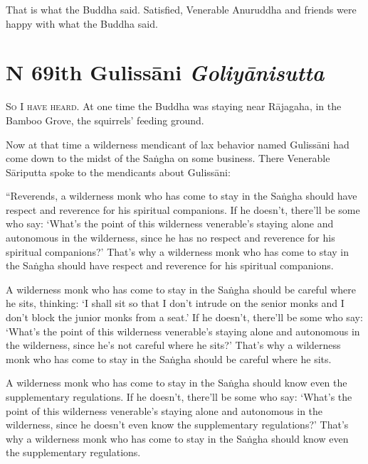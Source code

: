 \documentclass[12pt,openany]{book}%
\newcommand*{\suttatitleacronym}[1]{\smaller[2]{#1}\vspace*{.3em}}
\newcommand*{\suttatitletranslation}[1]{\linebreak{#1}}
\newcommand*{\suttatitleroot}[1]{\linebreak\smaller[2]\itshape{#1}}
\newcommand*{\tocacronym}[1]{\hspace*{-3.3em}{#1}\quad}
\newcommand*{\toctranslation}[1]{#1}
\newcommand*{\tocroot}[1]{(\textit{#1})}
\newcommand*{\scevam}[1]{\textsc{#1}}
\begin{document}
That is what the Buddha said. Satisfied, Venerable Anuruddha and friends were happy with what the Buddha said. 

%
\section*{{\suttatitleacronym MN 69}{\suttatitletranslation With Gulissāni }{\suttatitleroot Goliyānisutta}}
\addcontentsline{toc}{section}{\tocacronym{MN 69} \toctranslation{With Gulissāni } \tocroot{Goliyānisutta}}

\scevam{So I have heard. }At one time the Buddha was staying near \textsanskrit{Rājagaha}, in the Bamboo Grove, the squirrels’ feeding ground. 

Now at that time a wilderness mendicant of lax behavior named \textsanskrit{Gulissāni} had come down to the midst of the \textsanskrit{Saṅgha} on some business. There Venerable \textsanskrit{Sāriputta} spoke to the mendicants about \textsanskrit{Gulissāni}: 

“Reverends, a wilderness monk who has come to stay in the \textsanskrit{Saṅgha} should have respect and reverence for his spiritual companions. If he doesn’t, there’ll be some who say: ‘What’s the point of this wilderness venerable’s staying alone and autonomous in the wilderness, since he has no respect and reverence for his spiritual companions?’ That’s why a wilderness monk who has come to stay in the \textsanskrit{Saṅgha} should have respect and reverence for his spiritual companions. 

A wilderness monk who has come to stay in the \textsanskrit{Saṅgha} should be careful where he sits, thinking: ‘I shall sit so that I don’t intrude on the senior monks and I don’t block the junior monks from a seat.’ If he doesn’t, there’ll be some who say: ‘What’s the point of this wilderness venerable’s staying alone and autonomous in the wilderness, since he’s not careful where he sits?’ That’s why a wilderness monk who has come to stay in the \textsanskrit{Saṅgha} should be careful where he sits. 

A wilderness monk who has come to stay in the \textsanskrit{Saṅgha} should know even the supplementary regulations. If he doesn’t, there’ll be some who say: ‘What’s the point of this wilderness venerable’s staying alone and autonomous in the wilderness, since he doesn’t even know the supplementary regulations?’ That’s why a wilderness monk who has come to stay in the \textsanskrit{Saṅgha} should know even the supplementary regulations. 
\end{document}
